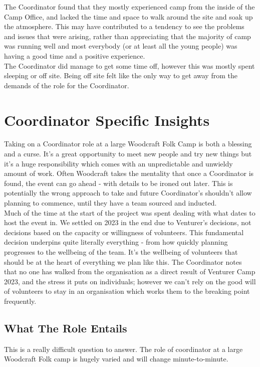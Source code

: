 The Coordinator found that they mostly experienced camp from the inside of the Camp Office, and lacked the time and space to walk around the site and soak up the atmosphere. This may have contributed to a tendency to see the problems and issues that were arising, rather than appreciating that the majority of camp was running well and most everybody (or at least all the young people) was having a good time and a positive experience.\\

The Coordinator did manage to get some time off, however this was mostly spent sleeping or off site. Being off site felt like the only way to get away from the demands of the role for the Coordinator. 

\section{Coordinator Specific Insights}
Taking on a Coordinator role at a large Woodcraft Folk Camp is both a blessing and a curse. It's a great opportunity to meet new people and try new things but it's a huge responsibility which comes with an unpredictable and unwieldy amount of work. Often Woodcraft takes the mentality that once a Coordinator is found, the event can go ahead - with details to be ironed out later. This is potentially the wrong approach to take and future Coordinator's shouldn't allow planning to commence, until they have a team sourced and inducted.\\

Much of the time at the start of the project was spent dealing with what dates to host the event in. We settled on 2023 in the end due to Venturer's decisions, not decisions based on the capacity or willingness of volunteers. This fundamental decision underpins quite literally everything - from how quickly planning progresses to the wellbeing of the team. It's the wellbeing of volunteers that should be at the heart of everything we plan like this. The Coordinator notes that no one has walked from the organisation as a direct result of Venturer Camp 2023, and the stress it puts on individuals; however we can't rely on the good will of volunteers to stay in an organisation which works them to the breaking point frequently.
\subsection{What The Role Entails}
This is a really difficult question to answer. The role of coordinator at a large Woodcraft Folk camp is hugely varied and will change minute-to-minute. \\

